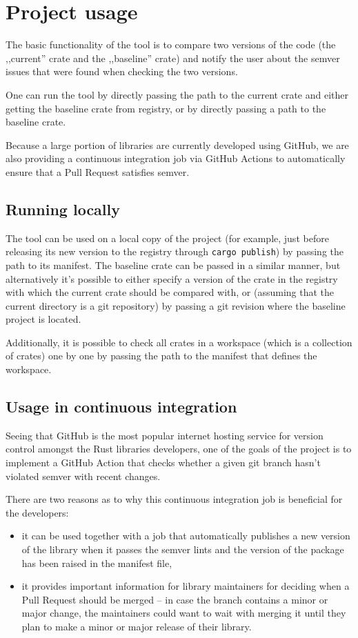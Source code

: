 \documentclass[licencjacka,en]{pracamgr}
\begin{document}
\section{Project usage}

The basic functionality of the tool is to compare two versions of the code
(the ,,current'' crate and the ,,baseline'' crate)
and notify the user about the semver issues that were found when checking the two versions.

One can run the tool by directly passing the path to the current crate
and either getting the baseline crate from registry, or by directly passing
a path to the baseline crate.

Because a large portion of libraries are currently developed using GitHub,
we are also providing a continuous integration job
via GitHub Actions to automatically ensure that
a Pull Request satisfies semver.

\subsection{Running locally}

The tool can be used on a local copy of the project
(for example, just before releasing its new version to the registry
through \texttt{cargo publish})
by passing the path to its manifest.
The baseline crate can be passed in a similar manner,
but alternatively it's possible to either
specify a version of the crate in the registry with which the
current crate should be compared with, or
(assuming that the current directory is a git repository)
by passing a git revision where the baseline project is located.

Additionally, it is possible to check all crates in a workspace
(which is a collection of crates)
one by one
by passing the path to the manifest that defines the workspace.

\subsection{Usage in continuous integration}

Seeing that GitHub is the most popular internet hosting service for version control
amongst the Rust libraries developers,
one of the goals of the project is to implement a GitHub Action
that checks whether a given git branch hasn't violated semver with recent changes.

There are two reasons as to why this continuous integration job is beneficial for the developers:
\begin{itemize}
	\item it can be used together with a job that automatically publishes a new version of the library
		when it passes the semver lints and the version of the package has been raised
		in the manifest file,
	\item it provides important information for library maintainers for deciding when
		a Pull Request should be merged -- in case the branch contains a minor or major change,
		the maintainers could want to wait with merging it until they plan to make
		a minor or major release of their library.
\end{itemize}
\end{document}
